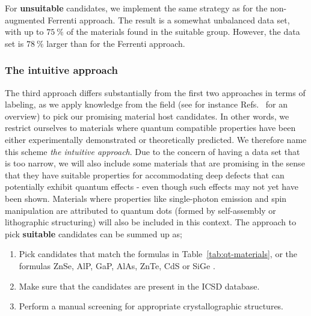 \documentclass[superscriptaddress,unsortedaddress,
 amsmath,amssymb,
 aps,
]{revtex4-2}
\begin{document}
For \textbf{unsuitable} candidates, we implement the same strategy as for the non-augmented Ferrenti approach. The result is a somewhat unbalanced data set, with up to $75 \ \%$ of the materials found in the suitable group. However, the data set is $78 \ \%$ larger than for the Ferrenti approach.

\subsubsection*{The intuitive approach}
The third approach differs substantially from the first two approaches in terms of labeling, as we apply knowledge from the field (see for instance Refs.~\cite{Atatuere2018,Zhang2020,Son2020,Toth2019,Bathen2021} for an overview) to pick our promising material host candidates. 
In other words, we restrict ourselves to materials where quantum compatible properties have been either experimentally demonstrated or theoretically predicted. 
We therefore name this scheme \emph{the intuitive approach}. Due to the concern of having a data set that is too narrow, we will also include some  materials that are promising in the sense that they have suitable properties for accommodating deep defects that can potentially exhibit quantum effects - even though such effects may not yet have been shown. 
Materials where properties like single-photon emission and spin manipulation are attributed to quantum dots (formed by self-assembly or lithographic structuring) will also be included in this context.  
The approach to pick \textbf{suitable} candidates can be summed up as;   
\begin{enumerate}
    \item Pick candidates that match the formulas in Table~\ref{tab:qt-materials}, or the formulas ZnSe, AlP, GaP, AlAs, ZnTe, CdS \cite{Weber2010} or SiGe \cite{Hardy2019}. 
    \item Make sure that the candidates are present in the ICSD database.  
    \item Perform a manual screening for appropriate crystallographic structures. 
\end{enumerate}
\end{document}
